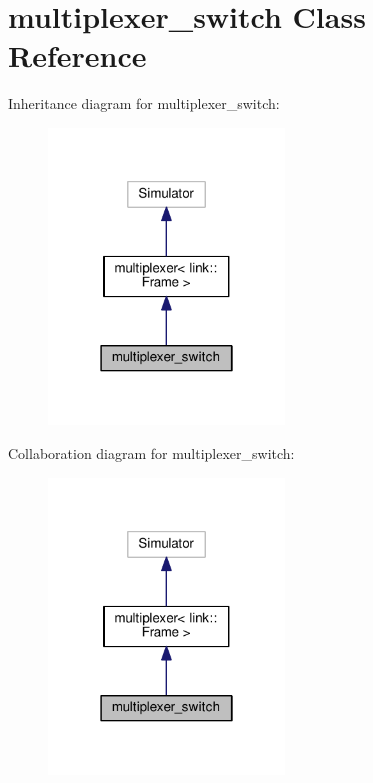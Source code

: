 \hypertarget{classmultiplexer__switch}{}\section{multiplexer\+\_\+switch Class Reference}
\label{classmultiplexer__switch}


Inheritance diagram for multiplexer\+\_\+switch\+:
\nopagebreak
\begin{figure}[H]
\begin{center}
\leavevmode
\includegraphics[width=178pt]{classmultiplexer__switch__inherit__graph}
\end{center}
\end{figure}


Collaboration diagram for multiplexer\+\_\+switch\+:
\nopagebreak
\begin{figure}[H]
\begin{center}
\leavevmode
\includegraphics[width=178pt]{classmultiplexer__switch__coll__graph}
\end{center}
\end{figure}
